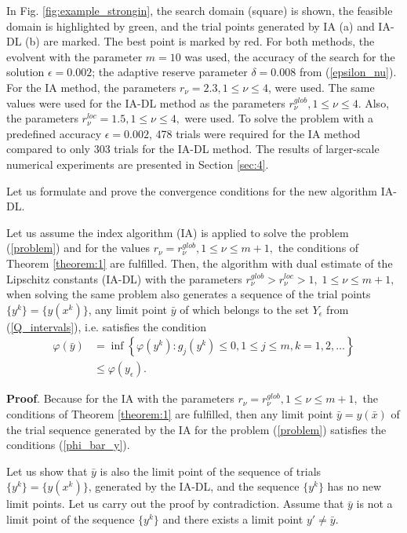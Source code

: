 \documentclass[twocolumn]{svjour3}          %
\begin{document}
	In Fig. \ref{fig:example_strongin}, the search domain (square) is shown, the feasible domain is highlighted by green, and the trial points generated by IA (a) and IA-DL (b) are marked. The best point is marked by red. For both methods, the evolvent with the parameter $m=10$ was used, the accuracy of the search for the solution $\epsilon=0.002$; the adaptive reserve parameter $\delta=0.008$ from (\ref{epsilon_nu}). For the IA method, the parameters $r_{\nu}=2.3, 1 \leq \nu \leq 4$, were used. The same values were used for the IA-DL method as the parameters $r_{\nu}^{glob}, 1 \leq \nu \leq 4$. Also, the parameters $r_{\nu}^{loc}=1.5, 1 \leq \nu \leq 4,$ were used. To solve the problem with a predefined accuracy $\epsilon=0.002$, 478 trials were required for the IA method compared to only 303 trials for the IA-DL method. The results of larger-scale numerical experiments are presented in Section \ref{sec:4}.

	Let us formulate and prove the convergence conditions for the new algorithm IA-DL.\\
\begin{theorem}\label{theorem:2} Let us assume the index algorithm (IA) is applied to solve the problem (\ref{problem}) and for the values $r_{\nu}=r_{\nu}^{glob}, 1 \leq \nu \leq m+1,$ the conditions of Theorem \ref{theorem:1} are fulfilled. Then, the algorithm with dual estimate of the Lipschitz constants (IA-DL) with the parameters $r_{\nu}^{glob}>r_{\nu}^{loc}>1,\; 1\leq \nu \leq m+1,$ when solving the same problem also generates a sequence of the trial points $\{y^k\}=\{y(x^k)\}$, any limit point $\bar{y}$ of which belongs to the set $Y_{\epsilon}$ from (\ref{Q_intervals}), i.e. satisfies the condition 
\begin{align}\label{phi_bar_y}
	\varphi(\bar y) & = \inf\left\{\varphi(y^k):g_j(y^k) \leq 0, 1 \leq j \leq m, k = 1,2,\ldots \right\} \nonumber \\
	& \leq \varphi(y_{\epsilon}).
\end{align}
\end{theorem}

\textbf{Proof}. Because for the IA with the parameters $r_{\nu}=r_{\nu}^{glob}, 1 \leq \nu \leq m+1,$ the conditions of Theorem \ref{theorem:1} are fulfilled, then any limit point $\bar{y}=y(\bar{x})$ of the trial sequence generated by the IA for the problem (\ref{problem}) satisfies the conditions (\ref{phi_bar_y}).

	Let us show that $\bar y$ is also the limit point of the sequence of trials $\{y^k\}=\{y(x^k)\}$, generated by the IA-DL, and the sequence $\{y^k\}$ has no new limit points. Let us carry out the proof by contradiction. Assume that $\bar y$ is not a limit point of the sequence $\{y^k\}$ and there exists a limit point $y' \neq \bar y$.
\end{document}
